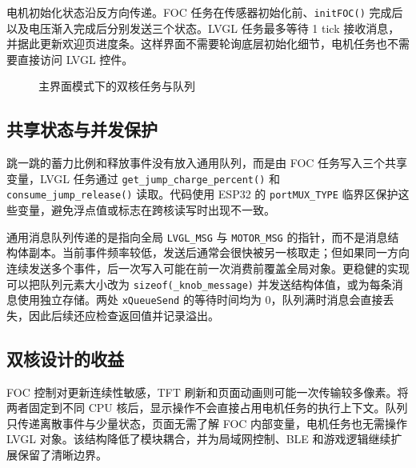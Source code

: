 电机初始化状态沿反方向传递。FOC 任务在传感器初始化前、\texttt{initFOC()} 完成后以及电压渐入完成后分别发送三个状态。LVGL 任务最多等待 1 tick 接收消息，并据此更新欢迎页进度条。这样界面不需要轮询底层初始化细节，电机任务也不需要直接访问 LVGL 控件。

\begin{figure}[H]
\centering
{}
\caption{主界面模式下的双核任务与队列}
\label{fig:dual-core}
\end{figure}

\subsection{共享状态与并发保护}

跳一跳的蓄力比例和释放事件没有放入通用队列，而是由 FOC 任务写入三个共享变量，LVGL 任务通过 \texttt{get\_jump\_charge\_percent()} 和 \texttt{consume\_jump\_release()} 读取。代码使用 ESP32 的 \texttt{portMUX\_TYPE} 临界区保护这些变量，避免浮点值或标志在跨核读写时出现不一致。

通用消息队列传递的是指向全局 \texttt{LVGL\_MSG} 与 \texttt{MOTOR\_MSG} 的指针，而不是消息结构体副本。当前事件频率较低，发送后通常会很快被另一核取走；但如果同一方向连续发送多个事件，后一次写入可能在前一次消费前覆盖全局对象。更稳健的实现可以把队列元素大小改为 \texttt{sizeof(\_knob\_message)} 并发送结构体值，或为每条消息使用独立存储。两处 \texttt{xQueueSend} 的等待时间均为 0，队列满时消息会直接丢失，因此后续还应检查返回值并记录溢出。

\subsection{双核设计的收益}

FOC 控制对更新连续性敏感，TFT 刷新和页面动画则可能一次传输较多像素。将两者固定到不同 CPU 核后，显示操作不会直接占用电机任务的执行上下文。队列只传递离散事件与少量状态，页面无需了解 FOC 内部变量，电机任务也无需操作 LVGL 对象。该结构降低了模块耦合，并为局域网控制、BLE 和游戏逻辑继续扩展保留了清晰边界。
